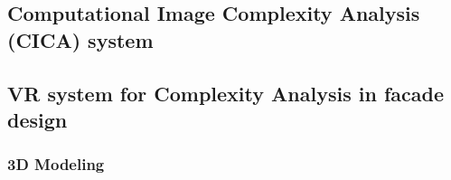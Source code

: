\documentclass[final,5p,times]{elsarticle}%
\begin{document}
\begin{linenumbers}
    \subsection{Computational Image Complexity Analysis (CICA) system}
    \label{subsec:Computational Image Complexity analysis}
    

    \subsection{VR system for Complexity Analysis in facade design}
    \label{subsec:VRsystemDevelopment}
    

        \subsubsection{3D Modeling}
        \label{subsubsec:Modeling}
        


\end{linenumbers}
\end{document}
